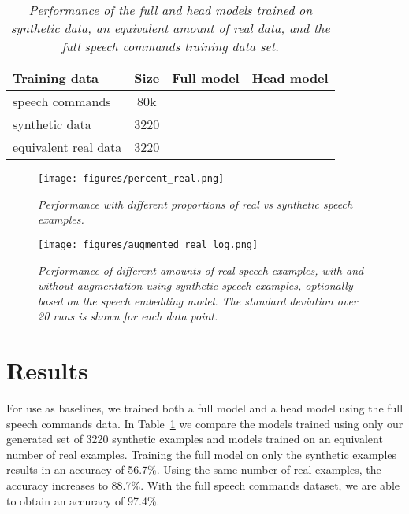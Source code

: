 \documentclass{article}
\begin{document}
\begin{table}[t]
    \centering
    \caption{\textit{Performance of the full and head models trained on synthetic data, an equivalent amount of real data, and the full speech commands training data set.}}
     \label{tab:model_accuracy}
    \begin{tabular}{l|c|c|c}
        Training data           &  Size   &   Full model          &   Head model         \\\hline
       speech commands         &  80k    &      &      \\
        synthetic data          &  3220   &      &      \\
        equivalent real data    &  3220   &      &      
    \end{tabular}
\end{table}

\begin{figure}[t]
    \centering
\texttt{[image: figures/percent\_real.png]}
    \caption{\textit{Performance with different proportions of real vs synthetic speech examples. \vspace{-0.3cm}}}
    \label{fig:real_replaced_syn}
\end{figure}

\begin{figure*}[t]
    \centering
\texttt{[image: figures/augmented\_real\_log.png]}
    \vspace{-0.1cm}
    \caption{\textit{Performance of different amounts of real speech examples, with and without augmentation using synthetic speech examples, optionally based on the speech embedding model. The standard deviation over 20 runs is shown for each data point. \vspace{-0.3cm}}}
    \label{fig:real_plus_syn}
\end{figure*}






\section{Results}
\label{sec:results}
For use as baselines, we trained both a full model and a head model using the full speech commands data. In Table~\ref{tab:model_accuracy} we compare the models trained using only our generated set of 3220 synthetic examples and models trained on an equivalent number of real examples.
Training the full model on only the synthetic examples results in an accuracy of 56.7\%. Using the same number of real examples, the accuracy increases to 88.7\%. With the full speech commands dataset, we are able to obtain an accuracy of 97.4\%.
\end{document}
